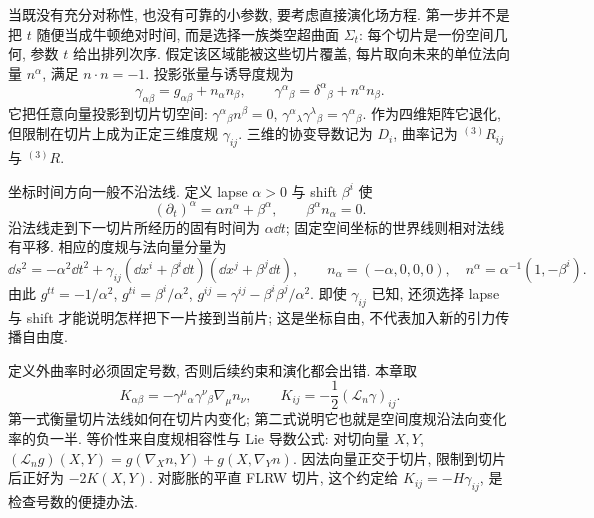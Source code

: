 
当既没有充分对称性, 也没有可靠的小参数, 要考虑直接演化场方程. 第一步并不是把 $t$ 随便当成牛顿绝对时间, 而是选择一族类空超曲面 $\Sigma_t$: 每个切片是一份空间几何, 参数 $t$ 给出排列次序. 假定该区域能被这些切片覆盖, 每片取向未来的单位法向量 $n^\alpha$, 满足 $n\cdot n=-1$. 投影张量与诱导度规为
\begin{equation}
 \gamma_{\alpha\beta}=g_{\alpha\beta}+n_\alpha n_\beta,\qquad
 \gamma^\alpha{}_{\beta}=\delta^\alpha{}_{\beta}+n^\alpha n_\beta.
 \label{eq:gr-adm-projector}
\end{equation}
它把任意向量投影到切片切空间: $\gamma^\alpha{}_{\beta}n^\beta=0$, $\gamma^\alpha{}_{\lambda}\gamma^\lambda{}_{\beta}=\gamma^\alpha{}_{\beta}$. 作为四维矩阵它退化, 但限制在切片上成为正定三维度规 $\gamma_{ij}$. 三维的协变导数记为 $D_i$, 曲率记为 ${}^{(3)}R_{ij}$ 与 ${}^{(3)}R$.

坐标时间方向一般不沿法线. 定义 lapse $\alpha>0$ 与 shift $\beta^i$ 使
\begin{equation}
 (\partial_t)^\alpha=\alpha n^\alpha+\beta^\alpha,\qquad
 \beta^\alpha n_\alpha=0.
\end{equation}
沿法线走到下一切片所经历的固有时间为 $\alpha\dd t$; 固定空间坐标的世界线则相对法线有平移. 相应的度规与法向量分量为
\begin{equation}
 \dd s^2=-\alpha^2\dd t^2
       +\gamma_{ij}(\dd x^i+\beta^i\dd t)(\dd x^j+\beta^j\dd t),\qquad
 n_\alpha=(-\alpha,0,0,0),\quad
 n^\alpha=\alpha^{-1}(1,-\beta^i).
 \label{eq:gr-adm-line}
\end{equation}
由此 $g^{tt}=-1/\alpha^2$, $g^{ti}=\beta^i/\alpha^2$, $g^{ij}=\gamma^{ij}-\beta^i\beta^j/\alpha^2$. 即使 $\gamma_{ij}$ 已知, 还须选择 lapse 与 shift 才能说明怎样把下一片接到当前片; 这是坐标自由, 不代表加入新的引力传播自由度.

定义外曲率时必须固定号数, 否则后续约束和演化都会出错. 本章取
\begin{equation}
 K_{\alpha\beta}=-\gamma^\mu{}_{\alpha}\gamma^\nu{}_{\beta}
                          \nabla_\mu n_\nu,
 \qquad K_{ij}=-\frac12(\mathcal L_n\gamma)_{ij}.
 \label{eq:gr-adm-k-sign}
\end{equation}
第一式衡量切片法线如何在切片内变化; 第二式说明它也就是空间度规沿法向变化率的负一半. 等价性来自度规相容性与 Lie 导数公式: 对切向量 $X,Y$, $(\mathcal L_n g)(X,Y)=g(\nabla_Xn,Y)+g(X,\nabla_Yn)$. 因法向量正交于切片, 限制到切片后正好为 $-2K(X,Y)$. 对膨胀的平直 FLRW 切片, 这个约定给 $K_{ij}=-H\gamma_{ij}$, 是检查号数的便捷办法.


